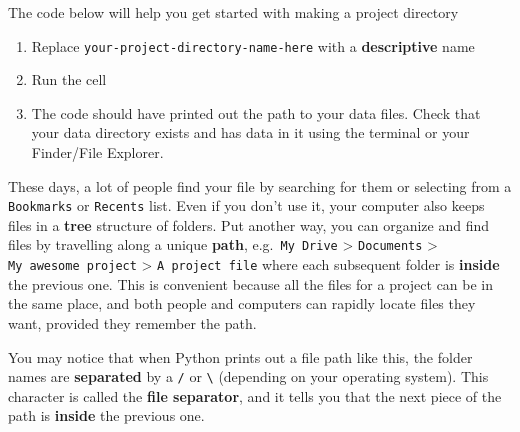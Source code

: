 \documentclass[
]{report}
\providecommand{\tightlist}{%
  \setlength{\itemsep}{0pt}\setlength{\parskip}{0pt}}
\begin{document}
\begin{tcolorbox}[enhanced jigsaw, breakable, colframe=quarto-callout-color-frame, toptitle=1mm, bottomrule=.15mm, colbacktitle=quarto-callout-color!10!white, opacityback=0, opacitybacktitle=0.6, coltitle=black, title=\textcolor{quarto-callout-color}{\faInfo}\hspace{0.5em}{Try It: Create a project folder}, left=2mm, bottomtitle=1mm, titlerule=0mm, arc=.35mm, colback=white, rightrule=.15mm, toprule=.15mm, leftrule=.75mm]

The code below will help you get started with making a project directory

\begin{enumerate}
\def\labelenumi{\arabic{enumi}.}
\tightlist
\item
  Replace
  \texttt{\textquotesingle{}your-project-directory-name-here\textquotesingle{}}
  with a \textbf{descriptive} name
\item
  Run the cell
\item
  The code should have printed out the path to your data files. Check
  that your data directory exists and has data in it using the terminal
  or your Finder/File Explorer.
\end{enumerate}

\end{tcolorbox}

\begin{tcolorbox}[enhanced jigsaw, breakable, colframe=quarto-callout-tip-color-frame, toptitle=1mm, bottomrule=.15mm, colbacktitle=quarto-callout-tip-color!10!white, opacityback=0, opacitybacktitle=0.6, coltitle=black, title=\textcolor{quarto-callout-tip-color}{\faLightbulb}\hspace{0.5em}{File structure}, left=2mm, bottomtitle=1mm, titlerule=0mm, arc=.35mm, colback=white, rightrule=.15mm, toprule=.15mm, leftrule=.75mm]

These days, a lot of people find your file by searching for them or
selecting from a \texttt{Bookmarks} or \texttt{Recents} list. Even if
you don't use it, your computer also keeps files in a \textbf{tree}
structure of folders. Put another way, you can organize and find files
by travelling along a unique \textbf{path}, e.g.~\texttt{My\ Drive}
\textgreater{} \texttt{Documents} \textgreater{}
\texttt{My\ awesome\ project} \textgreater{} \texttt{A\ project\ file}
where each subsequent folder is \textbf{inside} the previous one. This
is convenient because all the files for a project can be in the same
place, and both people and computers can rapidly locate files they want,
provided they remember the path.

You may notice that when Python prints out a file path like this, the
folder names are \textbf{separated} by a \texttt{/} or
\texttt{\textbackslash{}} (depending on your operating system). This
character is called the \textbf{file separator}, and it tells you that
the next piece of the path is \textbf{inside} the previous one.

\end{tcolorbox}
\end{document}
